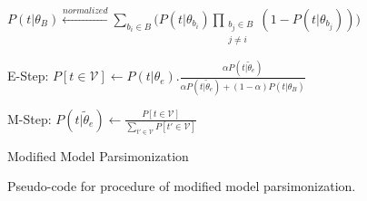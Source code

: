 \begin{figure}[!t]
\centering
\begin{algorithm}[H]
 \begin{algorithmic}[1]
% 
 \State \begin{tiny}$P(t|\theta_B) \xleftarrow{normalized} \sum_{b_i\in B} \bigg(P(t|\theta_{b_i}) \prod_{\substack{b_j\in B \\ j \neq i}} (1-P(t|\theta_{b_j}))\bigg)$ \end{tiny}
 \Repeat
 \State \begin{tiny}E-Step: $P[t\in \mathcal{V}] \gets P(t|\theta_e).\frac{\alpha P(t|\tilde{\theta}_e)}{\alpha P(t|\tilde{\theta}_e) + (1-\alpha) P(t|\theta_B)}$ \end{tiny}
  \State \begin{tiny}M-Step: $P(t|\tilde{\theta}_e) \gets \frac{ P[t \in \mathcal{V}]}{\sum_{t' \in \mathcal{V}} P[t' \in \mathcal{V}]}$ \end{tiny}
 \EndFor
 \EndProcedure
 \end{algorithmic}
 \caption{Modified Model Parsimonization}
\end{algorithm}
\caption{\label{alg:model_parsimonization}Pseudo-code for procedure of modified model parsimonization.}
\end{figure}